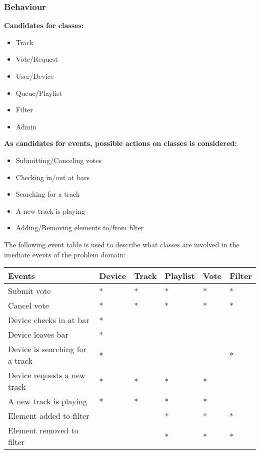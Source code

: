 \subsubsection{Behaviour}

\textbf{Candidates for classes:}
\begin{itemize}
\item Track
\item Vote/Request
\item User/Device
\item Queue/Playlist
\item Filter
\item Admin
\end{itemize}

\textbf{As candidates for events, possible actions on classes is considered:}
\begin{itemize}
\item Submitting/Canceling votes
\item Checking in/out at bars
\item Searching for a track
\item A new track is playing
\item Adding/Removing elements to/from filter
\end{itemize}

The following event table is used to describe what classes are involved in the imediate events of the problem domain:

\begin{center}
    \begin{tabular}{|l|l|l|l|l|l|}
    \hline
    \textbf{Events} & Device & Track & Playlist & Vote & Filter \\ \hline
    Submit vote & * & * & * & * & * \\ \hline
    Cancel vote & * & * & * & * & * \\ \hline
    Device checks in at bar & * &   &   &   &   \\ \hline
    Device leaves bar & * &   &   &   &   \\ \hline
    Device is searching for a track & * &   &   &  & * \\ \hline
    Device requests a new track & * & * & * & * &   \\ \hline
    A new track is playing & * & * & * & * &   \\ \hline
    Element added to filter &   &   & * & * & * \\ \hline
    Element removed to filter &   &   & * & * & * \\ \hline
    \end{tabular}
\end{center}